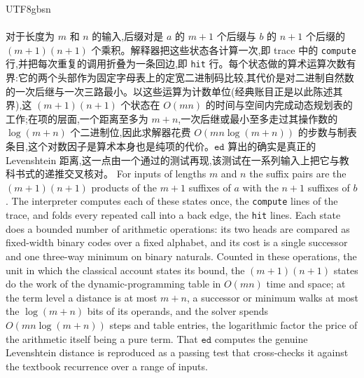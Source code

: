\begin{CJK*}{UTF8}{gbsn}
  \paragraph{}
  \ifPaperChinese
  对于长度为 $m$ 和 $n$ 的输入,后缀对是 $a$ 的 $m{+}1$ 个后缀与 $b$ 的 $n{+}1$ 个后缀的 $(m{+}1)(n{+}1)$ 个乘积。解释器把这些状态各计算一次,即 trace 中的 \texttt{compute} 行,并把每次重复的调用折叠为一条回边,即 \texttt{hit} 行。每个状态做的算术运算次数有界:它的两个头部作为固定字母表上的定宽二进制码比较,其代价是对二进制自然数的一次后继与一次三路最小。以这些运算为计数单位(经典账目正是以此陈述其界),这 $(m{+}1)(n{+}1)$ 个状态在 $O(mn)$ 的时间与空间内完成动态规划表的工作;在项的层面,一个距离至多为 $m+n$,一次后继或最小至多走过其操作数的 $\log(m+n)$ 个二进制位,因此求解器花费 $O(mn\log(m+n))$ 的步数与制表条目,这个对数因子是算术本身也是纯项的代价。$\mathtt{ed}$ 算出的确实是真正的 Levenshtein 距离,这一点由一个通过的测试再现,该测试在一系列输入上把它与教科书式的递推交叉核对。
  \else
  For inputs of lengths $m$ and $n$ the suffix pairs are the $(m{+}1)(n{+}1)$ products of the $m{+}1$ suffixes of $a$ with the $n{+}1$ suffixes of $b$. The interpreter computes each of these states once, the \texttt{compute} lines of the trace, and folds every repeated call into a back edge, the \texttt{hit} lines. Each state does a bounded number of arithmetic operations: its two heads are compared as fixed-width binary codes over a fixed alphabet, and its cost is a single successor and one three-way minimum on binary naturals. Counted in these operations, the unit in which the classical account states its bound, the $(m{+}1)(n{+}1)$ states do the work of the dynamic-programming table in $O(mn)$ time and space; at the term level a distance is at most $m+n$, a successor or minimum walks at most the $\log(m+n)$ bits of its operands, and the solver spends $O(mn\log(m+n))$ steps and table entries, the logarithmic factor the price of the arithmetic itself being a pure term. That $\mathtt{ed}$ computes the genuine Levenshtein distance is reproduced as a passing test that cross-checks it against the textbook recurrence over a range of inputs.
  \fi


\end{CJK*}
